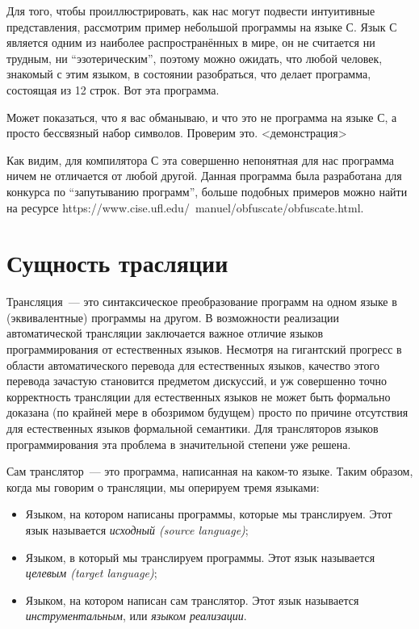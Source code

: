 \documentclass{article}
\begin{document}
Для того, чтобы проиллюстрировать, как нас могут подвести интуитивные представления, рассмотрим пример небольшой программы на языке С. Язык С является одним из
наиболее распространённых в мире, он не считается ни трудным, ни ``эзотерическим'', поэтому можно ожидать, что любой человек, знакомый с этим языком, в
состоянии разобраться, что делает программа, состоящая из 12 строк. Вот эта программа.

Может показаться, что я вас обманываю, и что это не программа на языке С, а просто бессвязный набор символов. Проверим это. <демонстрация>

Как видим, для компилятора С эта совершенно непонятная для нас программа ничем не отличается от любой другой. Данная программа была разработана для конкурса по
``запутыванию программ'', больше подобных примеров можно найти на ресурсе https://www.cise.ufl.edu/~manuel/obfuscate/obfuscate.html. 

\section{Сущность трасляции}

Трансляция~--- это синтаксическое преобразование программ на одном языке в (эквивалентные) программы на другом. В возможности реализации автоматической
трансляции заключается важное отличие языков программирования от естественных языков. Несмотря на гигантский прогресс в области автоматического перевода
для естественных языков, качество этого перевода зачастую становится предметом дискуссий, и уж совершенно точно корректность трансляции для естественных
языков не может быть формально доказана (по крайней мере в обозримом будущем) просто по причине отсутствия для естественных языков формальной семантики.
Для трансляторов языков программирования эта проблема в значительной степени уже решена.

Сам транслятор~--- это программа, написанная на каком-то языке. Таким образом, когда мы говорим о трансляции, мы оперируем тремя языками:

\begin{itemize}
\item Языком, на котором написаны программы, которые мы транслируем. Этот язык называется \emph{исходный (source language)};
\item Языком, в который мы транслируем программы. Этот язык называется \emph{целевым (target language)};
\item Языком, на котором написан сам транслятор. Этот язык называется \emph{инструментальным}, или \emph{языком реализации}.
\end{itemize}
\end{document}
